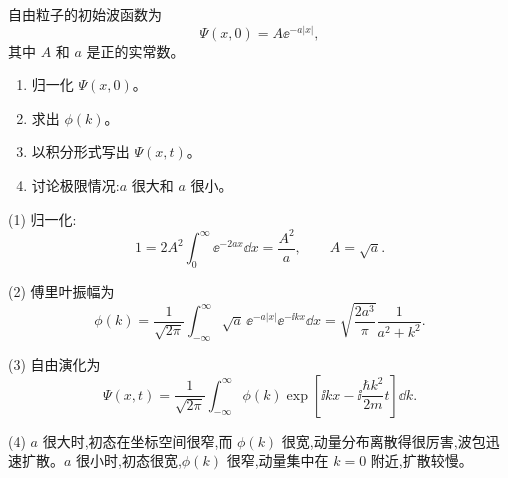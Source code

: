 \begin{question}
自由粒子的初始波函数为
\[
\Psi(x,0)=A\ee^{-a|x|},
\]
其中 $A$ 和 $a$ 是正的实常数。
\begin{enumerate}
\item 归一化 $\Psi(x,0)$。
\item 求出 $\phi(k)$。
\item 以积分形式写出 $\Psi(x,t)$。
\item 讨论极限情况:$a$ 很大和 $a$ 很小。
\end{enumerate}
\end{question}
\begin{solution}
(1) 归一化:
\[
1=2A^2\int_0^\infty \ee^{-2ax}\dd x=\frac{A^2}{a},
\qquad A=\sqrt a.
\]

(2) 傅里叶振幅为
\[
\phi(k)=\frac1{\sqrt{2\pi}}\int_{-\infty}^{\infty}\sqrt a\,\ee^{-a|x|}\ee^{-\ii kx}\dd x
=\sqrt{\frac{2a^3}{\pi}}\frac1{a^2+k^2}.
\]

(3) 自由演化为
\[
\Psi(x,t)=\frac1{\sqrt{2\pi}}\int_{-\infty}^{\infty}\phi(k)
\exp\left[\ii kx-\ii\frac{\hbar k^2}{2m}t\right]\dd k.
\]

(4) $a$ 很大时,初态在坐标空间很窄,而 $\phi(k)$ 很宽,动量分布离散得很厉害,波包迅速扩散。$a$ 很小时,初态很宽,$\phi(k)$ 很窄,动量集中在 $k=0$ 附近,扩散较慢。
\end{solution}

